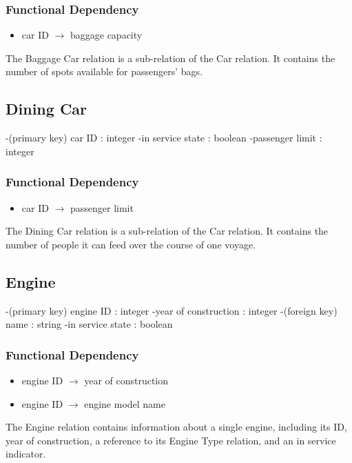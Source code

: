\documentclass[a4paper]{article}
\begin{document}
\subsubsection*{Functional Dependency}
\begin{itemize}
\item car ID $\rightarrow$ baggage capacity
\end{itemize}
The Baggage Car relation is a sub-relation of the Car relation. It contains the number of spots available for passengers' bags.

\subsection*{Dining Car}
\begin{itemize}
-(primary key) car ID : integer
-in service state : boolean
-passenger limit : integer
\end{itemize}
\subsubsection*{Functional Dependency}
\begin{itemize}
\item car ID $\rightarrow$ passenger limit
\end{itemize}
The Dining Car relation is a sub-relation of the Car relation. It contains the number of people it can feed over the course of one voyage.

\subsection*{Engine}
\begin{itemize}
-(primary key) engine ID : integer
-year of construction : integer
-(foreign key) name : string
-in service state : boolean
\end{itemize}
\subsubsection*{Functional Dependency}
\begin{itemize}
\item engine ID $\rightarrow$ year of construction
\item engine ID $\rightarrow$ engine model name
\end{itemize}
The Engine relation contains information about a single engine, including its ID, year of construction, a reference to its Engine Type relation, and an in service indicator.
\end{document}
